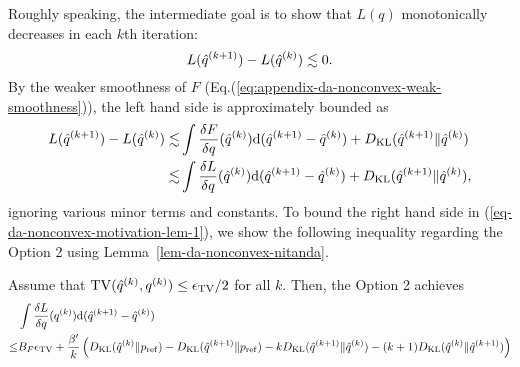 Roughly speaking, the intermediate goal is to show that $L(q)$ monotonically decreases in each $k$th iteration:
\begin{equation}
    L(\hat{q}^{(k+1)}) - L(\hat{q}^{(k)}) \lesssim 0.
\end{equation}
By the weaker smoothness of $F$ (Eq.(\ref{eq:appendix-da-nonconvex-weak-smoothness})), the left hand side is approximately bounded as
\begin{align}
    L(\hat{q}^{(k+1)}) - L(\hat{q}^{(k)}) \lesssim& \int \frac{\delta F}{\delta q}(\hat{q}^{(k)})\mathrm{d}(\hat{q}^{(k+1)} - \hat{q}^{(k)}) + D_{\mathrm{KL}}(\hat{q}^{(k+1)}\|\hat{q}^{(k)})\\
    \lesssim& \int \frac{\delta L}{\delta q}(\hat{q}^{(k)})\mathrm{d}(\hat{q}^{(k+1)} - \hat{q}^{(k)})+ D_{\mathrm{KL}}(\hat{q}^{(k+1)}\|\hat{q}^{(k)}),\label{eq-da-nonconvex-motivation-lem-1}
\end{align}
ignoring various minor terms and constants. To bound the right hand side in (\ref{eq-da-nonconvex-motivation-lem-1}), we show the following inequality regarding the Option 2 using Lemma~\ref{lem-da-nonconvex-nitanda}. 
\begin{lem}
    \label{lem-da-nonconvex-1}
    Assume that $\mathrm{TV}(\hat{q}^{(k)}, q^{(k)}) \leq \epsilon_{\mathrm{TV}}/2$ for all $k$. Then, the Option 2 achieves 
    \begin{align}
        &\int \frac{\delta L}{\delta q}(q^{(k)})\mathrm{d}(\hat{q}^{(k+1)} - \hat{q}^{(k)})\\
        \leq & B_F\epsilon_{\mathrm{TV}} + \frac{\beta'}{k}\left(D_{\mathrm{KL}}(\hat{q}^{(k)}\|p_{\rm{ref}})-D_{\mathrm{KL}}(\hat{q}^{(k+1)}\|p_{\rm{ref}})-kD_{\mathrm{KL}}(\hat{q}^{(k+1)}\|\hat{q}^{(k)})
        - (k+1)D_{\mathrm{KL}}(\hat{q}^{(k)} \| \hat{q}^{(k+1)}) \right)
    \end{align}
\end{lem}
